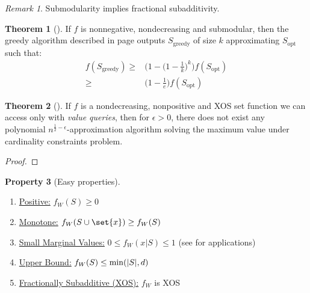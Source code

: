 \documentclass{article}
\theoremstyle{definition}
\newtheorem{theo}{Theorem}[section]
\newtheorem{prop}[theo]{Property}
\theoremstyle{remark}
\newtheorem*{rk}{Remark}
\begin{document}
\begin{rk}
  Submodularity implies fractional subadditivity.
\end{rk}


\begin{theo}[\cite{NWF78}]
  If $f$ is nonnegative, nondecreasing and submodular, then the greedy algorithm described in page \pageref{greedy} outputs $S_{\text{greedy}}$ of size $k$ approximating $S_{\text{opt}}$ such that:
  \begin{equation}
    \begin{aligned}
      f(S_{\text{greedy}}) \geq& \Big(1-\Big(1-\frac{1}{k}\Big)^k\Big)f(S_{\text{opt}})\\
      \geq& \Big(1-\frac{1}{e}\Big)f(S_{\text{opt}})
    \end{aligned}
  \end{equation}
\end{theo}

\begin{theo}[\cite{Sin10, BDO12}]
  If $f$ is a nondecreasing, nonpositive and XOS set function we can access only with \emph{value queries}, then for $\epsilon > 0$, there does not exist any polynomial $n^{\frac{1}{2}-\epsilon}$-approximation algorithm solving the maximum value under cardinality constraints problem.
\end{theo}

\begin{proof}
  
\end{proof}

\begin{prop}[Easy properties]
  \label{smallprops}
  \begin{enumerate}[label={(\arabic*)}]
  \item \underline{Positive:} $f_W(S) \geq 0$
  \item \underline{Monotone:} $f_W(S \cup \set{x}) \geq f_W(S)$
  \item \underline{Small Marginal Values:} $0 \leq f_W(x|S) \leq 1$ (see \cite{Vondrak10} for applications)
  \item \underline{Upper Bound:} $f_W(S) \leq \min(\abs{S},d)$
  \item \underline{Fractionally Subadditive (XOS):} $f_W$ is XOS
  \end{enumerate}
\end{prop}
\end{document}
